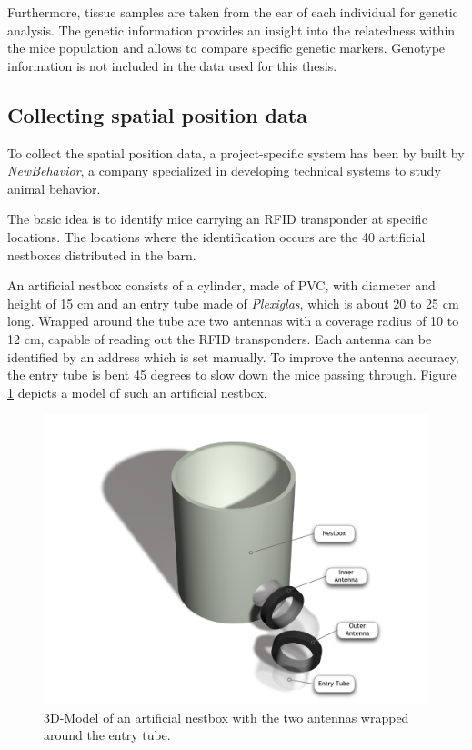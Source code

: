 Furthermore, tissue samples are taken from the ear of each individual for genetic analysis. The genetic information provides an insight into the relatedness within the mice population and allows to compare specific genetic markers. Genotype information is not included in the data used for this thesis.

\subsection{Collecting spatial position data}
\label{subsec:collectspatialpos}

To collect the spatial position data, a project-specific system has been by built by \textit{NewBehavior}, a company specialized in developing technical systems to study animal behavior.

The basic idea is to identify mice carrying an RFID transponder at specific locations. The locations where the identification occurs are the 40 artificial nestboxes distributed in the barn. 

An artificial nestbox consists of a cylinder, made of \ac{PVC}, with diameter and height of 15 cm and an entry tube made of \textit{Plexiglas}, which is about 20 to 25 cm long. Wrapped around the tube are two antennas with a coverage radius of 10 to 12 cm, capable of reading out the RFID transponders. Each antenna can be identified by an address which is set manually. To improve the antenna accuracy, the entry tube is bent 45 degrees to slow down the mice passing through. Figure \ref{fig:artNestbox} depicts a model of such an artificial nestbox.

\begin{figure}[htbp]	
\centering	
\includegraphics[width=\textwidth]{assets/pdf/box_schema.pdf}	
\caption[3D-Model of an artificial nestbox]{3D-Model of an artificial nestbox with the two antennas wrapped around the entry tube.}
\label{fig:artNestbox}
\end{figure}

